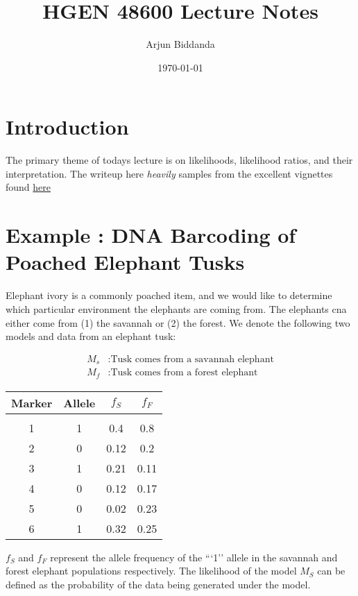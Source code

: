 \documentclass[11pt]{article}
\title{HGEN 48600 Lecture Notes}
\author{Arjun Biddanda}
\date{\today}
\begin{document}
\maketitle

\section*{Introduction}

The primary theme of todays lecture is on likelihoods, likelihood ratios, and their interpretation. The writeup here \textit{heavily} samples from the excellent vignettes found \href{http://stephens999.github.io/fiveMinuteStats/analysis/likelihood\_ratio\_simple\_models.html}{here}

\section*{Example : DNA Barcoding of Poached Elephant Tusks}

Elephant ivory is a commonly poached item, and we would like to determine which particular environment the elephants are coming from. The elephants cna either come from (1) the savannah or (2) the forest. We denote the following two models and data from an elephant tusk:

\begin{align*}
M_s &: \text{Tusk comes from a savannah elephant}\\
M_f &: \text{Tusk comes from a forest elephant}
\end{align*}


\begin{center}
	\begin{tabular}{ c | c | c | c }
		Marker & Allele & $f_S$ & $f_F$\\
		\hline & & & \\
	  1 & 1 & 0.4 & 0.8\\
	  2 & 0 & 0.12 & 0.2\\
	  3 & 1 & 0.21 & 0.11\\
	  4 & 0 & 0.12 & 0.17\\
	  5 & 0 & 0.02 & 0.23\\
	  6 & 1 & 0.32 & 0.25\\
	\end{tabular}
\end{center}

$f_S$ and $f_F$ represent the allele frequency of the ```1'' allele in the savannah and forest elephant populations respectively. The likelihood of the model $M_S$ can be defined as the probability of the data being generated under the model. 
\end{document}
